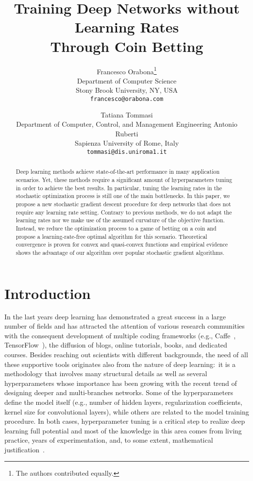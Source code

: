 \documentclass{article}
\title{Training Deep Networks without Learning Rates\\Through Coin Betting}
\author{
  Francesco Orabona\thanks{The authors contributed equally.} \\
  Department of Computer Science\\
  Stony Brook University, NY, USA\\
  \texttt{francesco@orabona.com}
  \and
  Tatiana Tommasi\footnotemark[1] \\
  Department of Computer, Control, and Management Engineering Antonio Ruberti\\
  Sapienza University of Rome, Italy \\
  \texttt{tommasi@dis.uniroma1.it}
}
\begin{document}
\maketitle

\begin{abstract}
Deep learning methods achieve state-of-the-art performance in many application scenarios. 
Yet, these methods require a significant amount of hyperparameters tuning in order to achieve 
the best results. In particular, tuning the learning rates in the stochastic optimization 
process is still one of the main bottlenecks.
In this paper, we propose a new stochastic gradient descent procedure for deep networks that 
does not require any learning rate setting. Contrary to previous methods, we do not adapt the 
learning rates nor we make use of the assumed curvature of the objective function. Instead, 
we reduce the optimization process to a game of betting on a coin and propose a learning-rate-free
optimal algorithm for this scenario.
Theoretical convergence is proven for convex and quasi-convex functions and empirical evidence shows 
the advantage of our algorithm over popular stochastic gradient algorithms.
 \end{abstract}

\section{Introduction}

In the last years deep learning has demonstrated a great success in a large number of fields
and has attracted the attention of various research communities with the consequent development
of multiple coding frameworks (e.g., Caffe~\citep{jia2014caffe}, TensorFlow~\citep{tensorflow2015-whitepaper}), 
the diffusion of blogs, online tutorials, books, and dedicated courses. Besides reaching out scientists
with different backgrounds, the need of all these supportive tools originates also from the nature 
of deep learning:~it is a methodology that involves many structural details as well as several hyperparameters
whose importance has been growing with the recent trend of designing deeper and multi-branches networks. Some of the hyperparameters define the model itself (e.g., number of hidden layers, regularization coefficients, kernel size for convolutional layers), while others are related 
to the model training procedure.
In both cases, hyperparameter tuning is a critical step to realize deep learning 
full potential and most of the knowledge in this area comes from living practice, years 
of experimentation, and, to some extent, mathematical justification~\citep{BookBengio2012}. 
\end{document}
